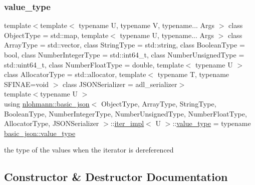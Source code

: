 \subsubsection{\texorpdfstring{value\+\_\+type}{value\_type}}
{\footnotesize\ttfamily template$<$template$<$ typename U, typename V, typename... Args $>$ class Object\+Type = std\+::map, template$<$ typename U, typename... Args $>$ class Array\+Type = std\+::vector, class String\+Type  = std\+::string, class Boolean\+Type  = bool, class Number\+Integer\+Type  = std\+::int64\+\_\+t, class Number\+Unsigned\+Type  = std\+::uint64\+\_\+t, class Number\+Float\+Type  = double, template$<$ typename U $>$ class Allocator\+Type = std\+::allocator, template$<$ typename T, typename S\+F\+I\+N\+A\+E=void $>$ class J\+S\+O\+N\+Serializer = adl\+\_\+serializer$>$ \\
template$<$typename U $>$ \\
using \hyperlink{classnlohmann_1_1basic__json}{nlohmann\+::basic\+\_\+json}$<$ Object\+Type, Array\+Type, String\+Type, Boolean\+Type, Number\+Integer\+Type, Number\+Unsigned\+Type, Number\+Float\+Type, Allocator\+Type, J\+S\+O\+N\+Serializer $>$\+::\hyperlink{classnlohmann_1_1basic__json_1_1iter__impl}{iter\+\_\+impl}$<$ U $>$\+::\hyperlink{classnlohmann_1_1basic__json_1_1iter__impl_a4d0518f3f2edae9dbaf7ef02f4f20add}{value\+\_\+type} =  typename \hyperlink{classnlohmann_1_1basic__json_a2b3297873b70c080837e8eedc4fec32f}{basic\+\_\+json\+::value\+\_\+type}}



the type of the values when the iterator is dereferenced 



\subsection{Constructor \& Destructor Documentation}
\mbox{\label{classnlohmann_1_1basic__json_1_1iter__impl_a3e45be67e4384b3eacb72bd6147a6a91}} 
